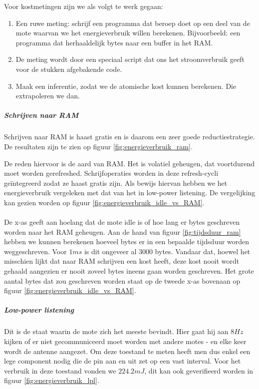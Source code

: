 \documentclass[11pt]{article}
\begin{document}
Voor kostmetingen zijn we als volgt te werk gegaan:

\begin{enumerate}
\item Een ruwe meting: schrijf een programma dat beroep doet op een deel
van de mote waarvan we het energieverbruik willen berekenen. Bijvoorbeeld: een
programma dat herhaaldelijk bytes naar een buffer in het RAM. 
\item De meting wordt door een speciaal script dat ons het stroomverbruik geeft voor de stukken afgebakende code.
\item Maak een inferentie, zodat we de atomische kost kunnen berekenen. Die extrapoleren we dan.
\end{enumerate}

\subparagraph{Schrijven naar RAM}

Schrijven naar RAM is haast gratis en is daarom een zeer goede
reductiestrategie. De resultaten zijn te zien op figuur \ref{fig:energieverbruik_ram}.

De reden hiervoor is de aard van RAM. Het is volatiel geheugen, dat voortdurend
moet worden gerefreshed. Schrijfoperaties worden in deze refresh-cycli
ge\"integreerd zodat ze haast gratis zijn. Als bewijs hiervan hebben we het energieverbruik vergeleken met dat van het in low-power listening. 
De vergelijking kan gezien worden op figuur \ref{fig:energieverbruik_idle_vs_RAM}.\\
\\
De x-as geeft aan hoelang dat de mote idle is of hoe lang er bytes geschreven worden naar het RAM geheugen. Aan de hand van figuur \ref{fig:tijdsduur_ram} hebben we kunnen berekenen hoeveel bytes er in een bepaalde tijdsduur worden weggeschreven. Voor $1ms$ is dit ongeveer al 3000 bytes. Vandaar dat, hoewel het misschien lijkt dat naar RAM schrijven een kost heeft, deze kost nooit wordt gehaald aangezien er nooit zoveel bytes ineens gaan worden geschreven. Het grote aantal bytes dat zou geschreven worden staat op de tweede x-as bovenaan op figuur \ref{fig:energieverbruik_idle_vs_RAM}. 
\subparagraph{Low-power listening}
Dit is de staat waarin de mote zich het meeste bevindt. Hier gaat hij aan $8Hz$
kijken of er niet gecommuniceerd moet worden met andere motes - en elke keer
wordt de antenne aangezet. Om deze toestand te meten heeft men dus enkel een
lege component nodig die de pin aan en uit zet op een vast interval. Voor het
verbruik in deze toestand vonden we $224.2mJ$, dit kan ook geverifieerd worden
in figuur \ref{fig:energieverbruik_lpl}.
\end{document}

